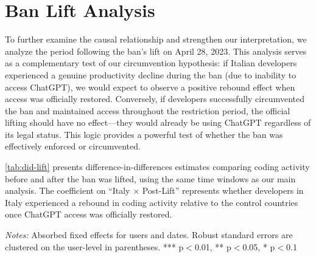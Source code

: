 




\appendix

\section{Ban Lift Analysis}
\label{appendix:banlift}

To further examine the causal relationship and strengthen our interpretation, we analyze the period following the ban's lift on April 28, 2023. This analysis serves as a complementary test of our circumvention hypothesis: if Italian developers experienced a genuine productivity decline during the ban (due to inability to access ChatGPT), we would expect to observe a positive rebound effect when access was officially restored. Conversely, if developers successfully circumvented the ban and maintained access throughout the restriction period, the official lifting should have no effect---they would already be using ChatGPT regardless of its legal status. This logic provides a powerful test of whether the ban was effectively enforced or circumvented.

\autoref{tab:did-lift} presents difference-in-differences estimates comparing coding activity before and after the ban was lifted, using the same time windows as our main analysis. The coefficient on ``Italy × Post-Lift'' represents whether developers in Italy experienced a rebound in coding activity relative to the control countries once ChatGPT access was officially restored.

\begin{table}[htbp]
  \centering
  \caption{Difference-in-Differences Results: Post-Ban Lift (Absorbed Fixed Effects)}
  \label{tab:did-lift}
  
  \par\vspace{0.1cm}
  \textit{Notes:} Absorbed fixed effects for users and dates. Robust standard errors are clustered on the user-level in parentheses. *** p$<$0.01, ** p$<$0.05, * p$<$0.1
\end{table}

